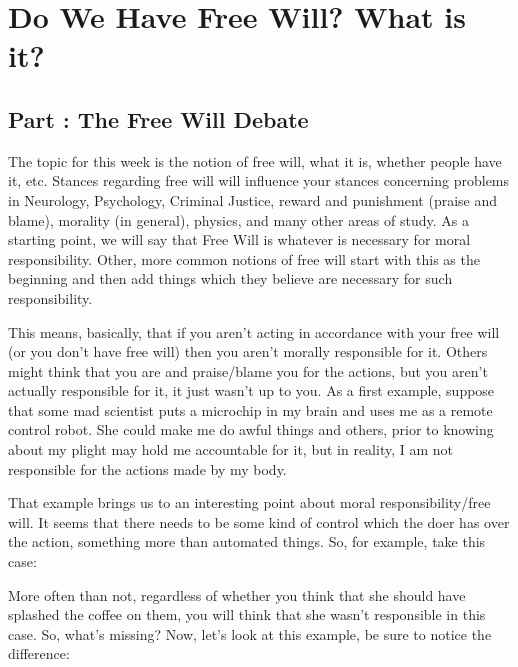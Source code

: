 \part{Do We Have Free Will? What is it?}
\label{ch.modFour}
\chapter{Part \thechapcount: The Free Will Debate}\setcounter{seccount}{1}
The topic for this week is the notion of free will, what it is, whether people have it, etc. Stances regarding free will will influence your stances concerning problems in Neurology, Psychology, Criminal Justice, reward and punishment (praise and blame), morality (in general), physics, and many other areas of study. As a starting point, we will say that Free Will is whatever is necessary for moral responsibility. Other, more common notions of free will start with this as the beginning and then add things which they believe are necessary for such responsibility. 

This means, basically, that if you aren't acting in accordance with your free will (or you don't have free will) then you aren't morally responsible for it. Others might think that you are and praise/blame you for the actions, but you aren't actually responsible for it, it just wasn't up to you. As a first example, suppose that some mad scientist puts a microchip in my brain and uses me as a remote control robot. She could make me do awful things and others, prior to knowing about my plight may hold me accountable for it, but in reality, I am not responsible for the actions made by my body. 

That example brings us to an interesting point about moral responsibility/free will. It seems that there needs to be some kind of control which the doer has over the action, something more than automated things. So, for example, take this case:


More often than not, regardless of whether you think that she should have splashed the coffee on them, you will think that she wasn't responsible in this case. So, what's missing? Now, let's look at this example, be sure to notice the difference:


